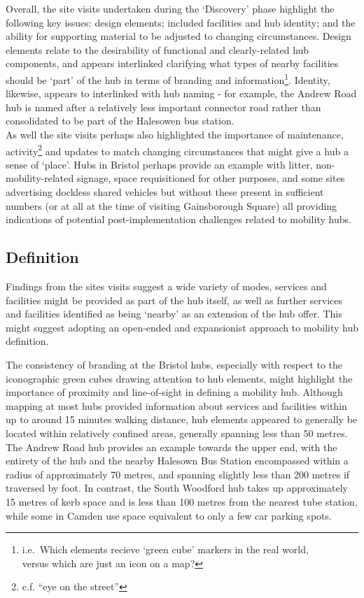 \documentclass[preprint, 3p,
authoryear]{elsarticle} %
\begin{document}
Overall, the site visits undertaken during the `Discovery' phase
highlight the following key issues: design elements; included facilities
and hub identity; and the ability for supporting material to be adjusted
to changing circumstances. Design elements relate to the desirability of
functional and clearly-related hub components, and appears interlinked
clarifying what types of nearby facilities should be `part' of the hub
in terms of branding and information\footnote{i.e.~Which elements
  recieve `green cube' markers in the real world,\\
  versus which are just an icon on a map?}. Identity, likewise, appears
to interlinked with hub naming - for example, the Andrew Road hub is
named after a relatively less important connector road rather than
consolidated to be part of the Halesowen bus station.\\
As well the site visits perhaps also highlighted the importance of
maintenance, activity\footnote{c.f. \citet{Jacobs:1961aa} ``eye on the
  street''} and updates to match changing circumstances that might give
a hub a sense of `place'. Hubs in Bristol perhaps provide an example
with litter, non-mobility-related signage, space requisitioned for other
purposes, and some sites advertising dockless shared vehicles but
without these present in sufficient numbers (or at all at the time of
visiting Gainsborough Square) all providing indications of potential
post-implementation challenges related to mobility hubs.

\subsection{Definition}\label{definition}

Findings from the sites visits suggest a wide variety of modes, services
and facilities might be provided as part of the hub itself, as well as
further services and facilities identified as being `nearby' as an
extension of the hub offer. This might suggest adopting an open-ended
and expansionist approach to mobility hub definition.

The consistency of branding at the Bristol hubs, especially with respect
to the iconographic green cubes drawing attention to hub elements, might
highlight the importance of proximity and line-of-sight in defining a
mobility hub. Although mapping at most hubs provided information about
services and facilities within up to around 15 minutes walking distance,
hub elements appeared to generally be located within relatively confined
areas, generally spanning less than 50 metres. The Andrew Road hub
provides an example towards the upper end, with the entirety of the hub
and the nearby Halesown Bus Station encompassed within a radius of
approximately 70 metres, and spanning slightly less than 200 metres if
traversed by foot. In contrast, the South Woodford hub takes up
approximately 15 metres of kerb space and is less than 100 metres from
the nearest tube station, while some in Camden use space equivalent to
only a few car parking spots.
\end{document}
